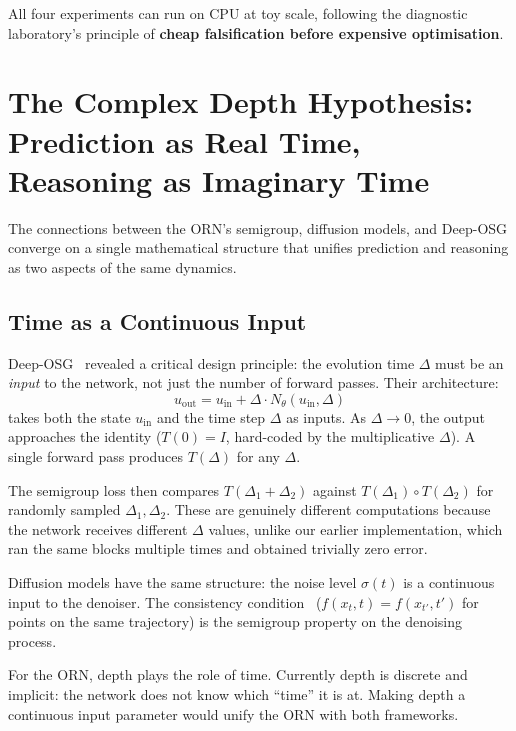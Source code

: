\documentclass[11pt, a4paper]{article}
\theoremstyle{plain}
\theoremstyle{remark}
\begin{document}
All four experiments can run on CPU at toy scale, following the diagnostic laboratory's principle of \textbf{cheap falsification before expensive optimisation}.

\section{The Complex Depth Hypothesis: Prediction as Real Time, Reasoning as Imaginary Time}\label{sec:complex-depth}

The connections between the ORN's semigroup, diffusion models, and Deep-OSG converge on a single mathematical structure that unifies prediction and reasoning as two aspects of the same dynamics.

\subsection{Time as a Continuous Input}

Deep-OSG~\cite{deeposg2023} revealed a critical design principle: the evolution time $\Delta$ must be an \emph{input} to the network, not just the number of forward passes.
Their architecture:
\[
u_{\text{out}} = u_{\text{in}} + \Delta \cdot N_\theta(u_{\text{in}}, \Delta)
\]
takes both the state $u_{\text{in}}$ and the time step $\Delta$ as inputs.
As $\Delta \to 0$, the output approaches the identity ($T(0) = I$, hard-coded by the multiplicative $\Delta$).
A single forward pass produces $T(\Delta)$ for any $\Delta$.

The semigroup loss then compares $T(\Delta_1 + \Delta_2)$ against $T(\Delta_1) \circ T(\Delta_2)$ for randomly sampled $\Delta_1, \Delta_2$.
These are genuinely different computations because the network receives different $\Delta$ values, unlike our earlier implementation, which ran the same blocks multiple times and obtained trivially zero error.

Diffusion models have the same structure: the noise level $\sigma(t)$ is a continuous input to the denoiser.
The consistency condition~\cite{song2023consistency} ($f(x_t, t) = f(x_{t'}, t')$ for points on the same trajectory) is the semigroup property on the denoising process.

For the ORN, depth plays the role of time.
Currently depth is discrete and implicit: the network does not know which ``time'' it is at.
Making depth a continuous input parameter would unify the ORN with both frameworks.
\end{document}
